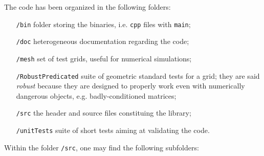 \documentclass[11pt,a4paper]{article}
\theoremstyle{definition}
\theoremstyle{theorem}
\numberwithin{equation}{section}
\numberwithin{figure}{section}
\begin{document}
		The code has been organized in the following folders:
		\begin{itemize}
			\item[\texttt{/bin}] folder storing the binaries, i.e. \texttt{cpp} files with \texttt{main};
			\item[\texttt{/doc}] heterogeneous documentation regarding the code;
			\item[\texttt{/mesh}] set of test grids, useful for numerical simulations;
			\item[\texttt{/RobustPredicated}] suite of geometric standard tests for a grid; they are said \emph{robust} because they are designed to properly work even with numerically dangerous objects, e.g. badly-conditioned matrices;
			\item[\texttt{/src}] the header and source files constituing the library;
			\item[\texttt{/unitTests}] suite of short tests aiming at validating the code.
		\end{itemize}
		Within the folder \texttt{/src}, one may find the following subfolders:
\end{document}
